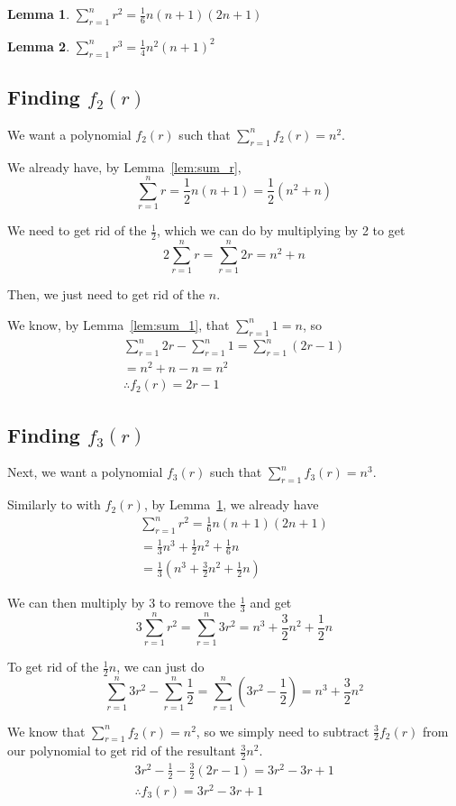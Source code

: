 \documentclass[a4paper]{article}
\newcommand{\sn}{\sum\limits_{r=1}^{n}}
\newcommand{\oo}[1]{\frac{1}{#1}}
\newtheorem{lemma}{Lemma}
\begin{document}
\begin{lemma}
$\displaystyle \sn r^2 = \oo{6}n(n + 1)(2n + 1)$
\label{lem:sum_r2}
\end{lemma}

\begin{lemma}
$\displaystyle \sn r^3 = \oo{4}n^2(n + 1)^2$
\label{lem:sum_r3}
\end{lemma}

\subsection{Finding $f_2(r)$}
We want a polynomial $f_2(r)$ such that $\sn f_2(r) = n^2$.

We already have, by Lemma~\ref{lem:sum_r}, $$\sn r = \oo{2}n(n + 1) = \oo{2}\left(n^2 + n\right)$$

We need to get rid of the $\oo{2}$, which we can do by multiplying by 2 to get $$2 \sn r = \sn 2r = n^2 + n$$

Then, we just need to get rid of the $n$.

We know, by Lemma~\ref{lem:sum_1}, that $\sn 1 = n$, so
\begin{gather*}
\sn 2r - \sn 1 = \sn (2r - 1)\\[0.5em]
= n^2 + n - n = n^2\\[0.5em]
\therefore f_2(r) = 2r - 1
\end{gather*}

\subsection{Finding $f_3(r)$}

Next, we want a polynomial $f_3(r)$ such that $\sn f_3(r) = n^3$.

Similarly to with $f_2(r)$, by Lemma~\ref{lem:sum_r2}, we already have
\begin{gather*}
\sn r^2 = \oo{6}n(n + 1)(2n + 1)\\[0.5em]
= \oo{3}n^3 + \oo{2}n^2 + \oo{6}n\\[0.5em]
= \oo{3}\left(n^3 + \frac{3}{2}n^2 + \oo{2}n\right)
\end{gather*}

We can then multiply by $3$ to remove the $\oo{3}$ and get $$3 \sn r^2 = \sn 3r^2 = n^3 + \frac{3}{2}n^2 + \oo{2}n$$

To get rid of the $\oo{2}n$, we can just do $$\sn 3r^2 - \sn \oo{2} = \sn \left(3r^2 - \oo{2}\right) = n^3 + \frac{3}{2}n^2$$

We know that $\sn f_2(r) = n^2$, so we simply need to subtract $\frac{3}{2}f_2(r)$ from our polynomial to get rid of the resultant $\frac{3}{2}n^2$.
\begin{gather*}
3r^2 - \oo{2} - \frac{3}{2}(2r - 1) = 3r^2 - 3r + 1\\[0.5em]
\therefore f_3(r) = 3r^2 - 3r + 1
\end{gather*}
\end{document}
